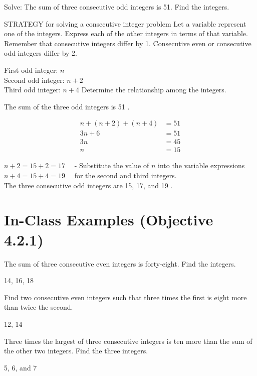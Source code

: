 \documentclass{ximera}
\begin{document}
\begin{problem}
Solve: The sum of three consecutive odd integers is 51. Find the integers.

STRATEGY  for solving a consecutive integer problem
Let a variable represent one of the integers. Express each of the other integers in terms of that variable. Remember that consecutive integers differ by 1. Consecutive even or consecutive odd integers differ by 2.

\begin{solution}
First odd integer: $n$\\
Second odd integer: $n+2$\\
Third odd integer: $n+4$
Determine the relationship among the integers.


The sum of the three odd integers is 51 .

$$\begin{aligned}
n+(n+2)+(n+4) & =51 \\
3 n+6 & =51 \\
3 n & =45 \\
n & =15
\end{aligned}$$

$n+2=15+2=17 \quad$ - Substitute the value of $n$ into the variable expressions $n+4=15+4=19 \quad$ for the second and third integers.\\
The three consecutive odd integers are 15, 17, and 19 .
\end{solution}
\end{problem}

\section*{In-Class Examples (Objective 4.2.1)}

\begin{problem}
The sum of three consecutive even integers is forty-eight. Find the integers.
\begin{solution}
14, 16, 18
\end{solution}
\end{problem}

\begin{problem}
Find two consecutive even integers such that three times the first is eight more than twice the second.
\begin{solution}
12, 14
\end{solution}
\end{problem}

\begin{problem}
Three times the largest of three consecutive integers is ten more than the sum of the other two integers. Find the three integers.
\begin{solution}
5, 6, and 7
\end{solution}
\end{problem}
\end{document}
